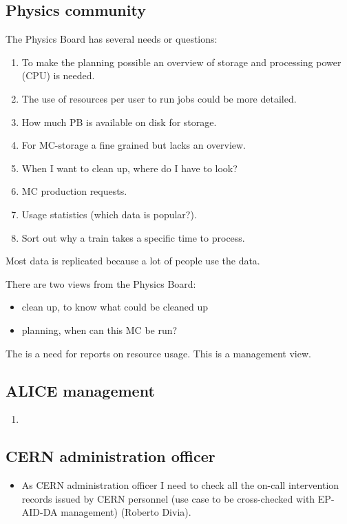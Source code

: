 \subsection{Physics community}
The Physics Board has several needs or questions:
\begin{enumerate}
  \item To make the planning possible an overview of storage and processing power (CPU) is needed. 
  \item The use of resources per user to run jobs could be more detailed.
  \item How much PB is available on disk for storage.
  \item For MC-storage a fine grained but lacks an overview.
  \item When I want to clean up, where do I have to look?
  \item MC production requests.
  \item Usage statistics (which data is popular?).
  \item Sort out why a train takes a specific time to process.
\end{enumerate}
Most data is replicated because a lot of people use the data.

There are two views from the Physics Board:
\begin{itemize}
  \item clean up, to know what could be cleaned up
  \item planning, when can this MC be run?
\end{itemize}
The is a need for reports on resource usage. This is a management view.

\subsection{ALICE management}
\begin{enumerate}
  \item 
\end{enumerate}


\subsection{CERN administration officer}
\begin{itemize}
  \item As CERN administration officer I need to check all the on-call intervention records issued by CERN personnel (use case to be cross-checked with EP-AID-DA management) (Roberto Divia).
\end{itemize}

